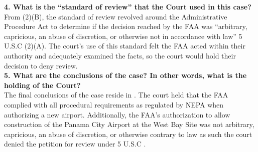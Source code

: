 \documentclass[12pt]{article}
\begin{document}
\textbf{4. What is the “standard of review” that the Court used in this case?} \\

From \textsection(2)(B), the standard of review revolved around the Administrative Procedure Act to determine if the decision reached by the FAA was ``arbitrary, capricious, an abuse of discretion, or otherwise not in accordance with law'' 5 U.S.C (2)(A). The court's use of this standard felt the FAA acted within their authority and adequately examined the facts, so the court would hold their decision to deny review.  \\

\textbf{5. What are the conclusions of the case? In other words, what is the holding of the Court?} \\

The final conclusions of the case reside in . The court held that the FAA complied with all procedural requirements as regulated by NEPA when authorizing a new airport. Additionally, the FAA's authorization to allow construction of the Panama City Airport at the West Bay Site was not arbitrary, capricious, an abuse of discretion, or otherwise contrary to law as such the court denied the petition for review under 5 U.S.C .\\
\end{document}
